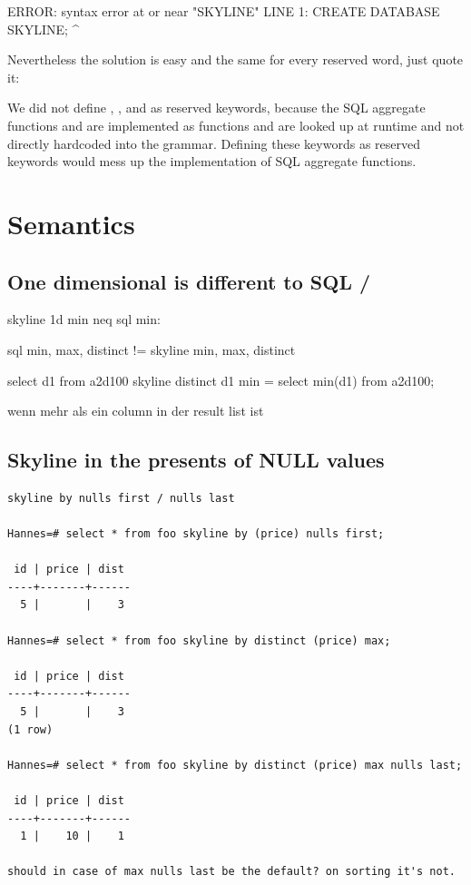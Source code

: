 \begin{interactive}
ERROR:  syntax error at or near "SKYLINE"
LINE 1: CREATE DATABASE SKYLINE;
                        ^
\end{interactive}
\noindent
Nevertheless the solution is easy and the same for every reserved
word, just quote it:
\begin{interactive}
\end{interactive}

We did not define , , and
 as reserved keywords, because the SQL aggregate
functions  and  are implemented as
functions and are looked up at runtime and not directly hardcoded into
the grammar. Defining these keywords as reserved keywords would mess
up the implementation of SQL aggregate functions.

\section{Semantics}

\subsection{One dimensional  is different to SQL /}

skyline 1d min neq sql min:

sql min, max, distinct != skyline min, max, distinct


select d1 from a2d100 skyline distinct d1 min = select min(d1) from a2d100;


wenn mehr als ein column in der result list ist



\subsection{Skyline in the presents of NULL values}
\begin{verbatim}
skyline by nulls first / nulls last

Hannes=# select * from foo skyline by (price) nulls first;

 id | price | dist
----+-------+------
  5 |       |    3

Hannes=# select * from foo skyline by distinct (price) max;

 id | price | dist
----+-------+------
  5 |       |    3
(1 row)

Hannes=# select * from foo skyline by distinct (price) max nulls last;

 id | price | dist
----+-------+------
  1 |    10 |    1

should in case of max nulls last be the default? on sorting it's not.
\end{verbatim}

